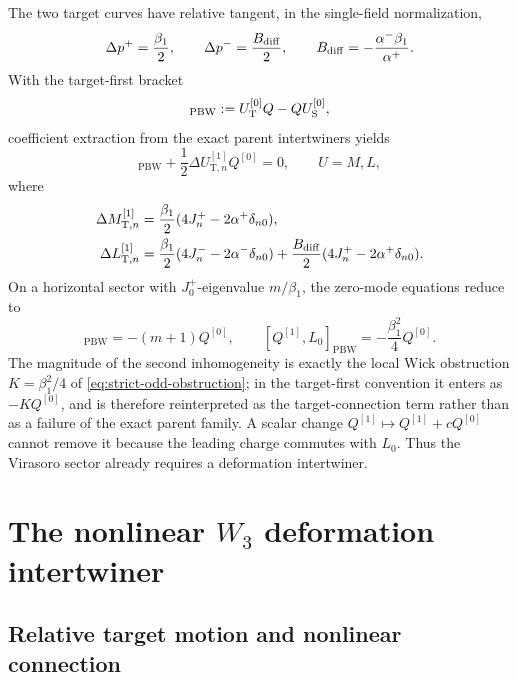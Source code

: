 \documentclass[11pt,a4paper]{article}
\numberwithin{equation}{section}
\theoremstyle{remark}
\newcommand{\PBW}{\mathrm{PBW}}
\newcommand{\T}{\mathrm{T}}
\begin{document}
The two target curves have relative tangent, in the single-field normalization,
\begin{equation}
 \Delta p^+=\frac{\beta_1}{2},\qquad
 \Delta p^-=\frac{B_{\rm diff}}{2},\qquad
 B_{\rm diff}=-\frac{\alpha^-\beta_1}{\alpha^+}.
 \label{eq:A1-target-tangent}
\end{equation}
With the target-first bracket
\begin{equation}
 [Q,U]_{\PBW}:=U_{\T}^{[0]}Q-QU_{\rm S}^{[0]},
 \label{eq:PBW-bracket}
\end{equation}
coefficient extraction from the exact parent intertwiners yields
\begin{equation}
 [Q^{[1]},U_n^{[0]}]_{\PBW}
 +\frac12\Delta U_{\T,n}^{[1]}Q^{[0]}=0,
 \qquad U=M,L,
 \label{eq:A1-intertwiner}
\end{equation}
where
\begin{align}
 \Delta M_{\T,n}^{[1]}&=\frac{\beta_1}{2}
 (4J_n^+-2\alpha^+\delta_{n0}),
 \label{eq:delta-M}\\
 \Delta L_{\T,n}^{[1]}&=\frac{\beta_1}{2}
 (4J_n^--2\alpha^-\delta_{n0})
 +\frac{B_{\rm diff}}2(4J_n^+-2\alpha^+\delta_{n0}).
 \label{eq:delta-L}
\end{align}
On a horizontal sector with $J_0^+$-eigenvalue $m/\beta_1$, the zero-mode equations reduce to
\begin{equation}
 [Q^{[1]},M_0]_{\PBW}=-(m+1)Q^{[0]},\qquad
 [Q^{[1]},L_0]_{\PBW}=-\frac{\beta_1^2}{4}Q^{[0]}.
 \label{eq:A1-zero-mode-connection}
\end{equation}
The magnitude of the second inhomogeneity is exactly the local Wick obstruction
$K=\beta_1^2/4$ of \cref{eq:strict-odd-obstruction}; in the target-first convention it enters
as $-KQ^{[0]}$, and is therefore reinterpreted as the target-connection term rather than as a
failure of the exact parent family.  A scalar change
$Q^{[1]}\mapsto Q^{[1]}+cQ^{[0]}$ cannot remove it because the leading charge commutes with
$L_0$.
Thus the Virasoro sector already requires a deformation intertwiner.

\section{The nonlinear \texorpdfstring{$W_3$}{W3} deformation intertwiner}
\label{sec:nonlinear}

\subsection{Relative target motion and nonlinear connection}
\end{document}
